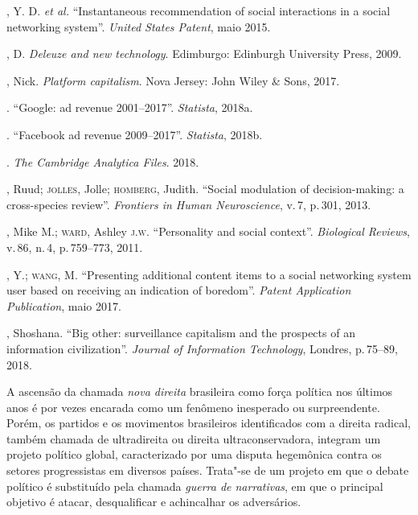 \begin{bibliohedra}
, Y. D. \textit{et al.} ``Instantaneous recommendation of
social interactions in a social networking system''. \textit{United States Patent}, maio 2015. 

, D. \textit{Deleuze and new technology}. Edimburgo: Edinburgh
University Press, 2009.

, Nick. \textit{Platform capitalism}. Nova Jersey: John Wiley \& Sons, 2017.

. ``Google: ad revenue 2001--2017''. \textit{Statista}, 2018a. 

\titidem. ``Facebook ad revenue 2009--2017''. \textit{Statista}, 2018b. 

. \textit{The Cambridge Analytica Files}. 2018. 

, Ruud; \textsc{jolles}, Jolle; \textsc{homberg}, Judith. ``Social modulation of decision-making: a cross-species review''. \textit{Frontiers in Human
Neuroscience}, v.\,7, p.\,301, 2013.

, Mike M.; \textsc{ward}, Ashley \textsc{j.w}. ``Personality and social context''. \textit{Biological Reviews}, v.\,86, n.\,4, p.\,759--773, 2011.

, Y.; \textsc{wang}, M. ``Presenting additional content items to a social
networking system user based on receiving an indication of boredom''. \textit{Patent Application Publication}, maio 2017.

, Shoshana. ``Big other: surveillance capitalism and the
prospects of an information civilization''. \textit{Journal of
Information Technology}, Londres, p.\,75--89, 2018.
\end{bibliohedra}



\begin{flushright}
\end{flushright}

\noindent{}A ascensão da chamada \textit{nova direita} brasileira como força política
nos últimos anos é por vezes encarada como um fenômeno inesperado ou
surpreendente. Porém, os partidos e os movimentos brasileiros
identificados com a direita radical, também chamada de ultradireita ou
direita ultraconservadora, integram um projeto político global,
caracterizado por uma disputa hegemônica contra os setores progressistas
em diversos países. Trata"-se de um projeto em que o debate político é
substituído pela chamada \textit{guerra de narrativas}, em que o principal
objetivo é atacar, desqualificar e achincalhar os adversários.

